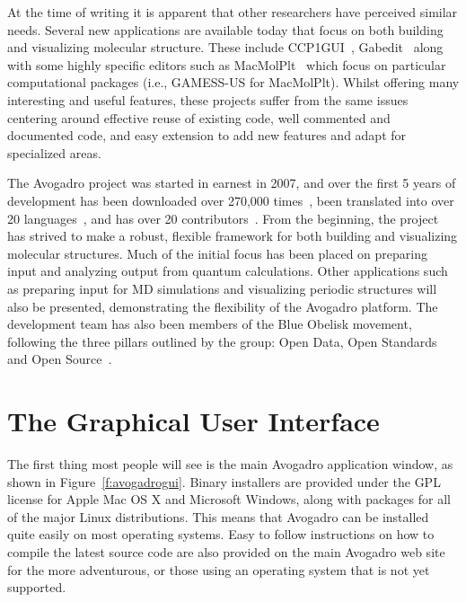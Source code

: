 \documentclass[10pt]{bmc_article}
\newenvironment{bmcformat}{\begin{raggedright}
\baselineskip20pt\sloppy\setboolean{publ}{false}}{\end{raggedright}
\baselineskip20pt\sloppy}
\begin{document}
\begin{bmcformat}
At the time of writing it is apparent that other researchers have perceived
similar needs. Several new applications are available today that focus on both
building and visualizing molecular structure. These include
CCP1GUI~\cite{CCP1GUI}, Gabedit~\cite{Gabedit} along with some highly specific
editors such as MacMolPlt~\cite{MacMolPlt} which focus on particular
computational packages (i.e., GAMESS-US for MacMolPlt). Whilst offering many
interesting and
useful features, these projects suffer from the same issues centering
around effective reuse of existing code, well commented and documented code, and
easy extension to add new features and adapt for specialized areas.

The Avogadro project was started in earnest in 2007, and over the
first 5 years of development has been downloaded over 270,000
times~\cite{Downloads}, been translated into over 20
languages~\cite{Translations}, and has over 20
contributors~\cite{OhlohContributors}. From the beginning, the project
has strived to make a robust, flexible framework for
both building and visualizing molecular structures. Much of the initial focus
has been placed on preparing input and analyzing output from quantum
calculations. Other applications such as preparing input for MD simulations and
visualizing periodic structures will also be presented, demonstrating the
flexibility of the Avogadro platform. The development team has also been
members of the Blue Obelisk movement, following the three pillars outlined by
the group: Open Data, Open Standards and Open Source~\cite{BlueObelisk2006,
BlueObelisk2011}.

\section{The Graphical User Interface}

The first thing most people will see is the main Avogadro application
window, as shown in Figure~\ref{f:avogadrogui}.
Binary installers are provided under the GPL license for Apple Mac OS X and
Microsoft Windows, along with packages for all of the major Linux distributions.
This means that Avogadro can be installed quite easily on most operating
systems. Easy to follow instructions on how to compile the latest source code
are also provided on the main Avogadro web
site\cite{CompileWindows}\cite{CompileLinux} for the more adventurous,
or those using an operating system that is not yet supported.


\end{bmcformat}
\end{document}
